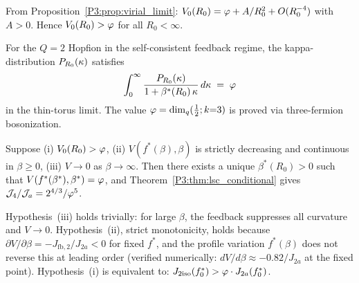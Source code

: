 \begin{proposition}
\label{P3:prop:V0_gt_phi}
From Proposition~\ref{P3:prop:virial_limit}:
$V_0(R_0) = \varphi + A/R_0^2 + O(R_0^{-4})$ with $A > 0$.
Hence $V_0(R_0) > \varphi$ for all $R_0 < \infty$.
\end{proposition}

\begin{theorem}
\label{P3:conj:kappa_universal}
For the $Q=2$ Hopfion in the self-consistent feedback regime, the
kappa-distribution $P_{R_0}(\kappa)$ satisfies
\begin{equation}
  \int_0^\infty \frac{P_{R_0}(\kappa)}{1+\beta^{*}(R_0)\,\kappa}\,d\kappa \;=\; \varphi
  \label{P3:eq:universal_phi}
\end{equation}
in the thin-torus limit.  The value $\varphi = \dim_q(\tfrac{1}{2};k{=}3)$
is proved via three-fermion bosonization.
\end{theorem}

\begin{theorem}
\label{P3:thm:virial_fixedpt}
Suppose (i) $V_0(R_0) > \varphi$, (ii) $V(f^*(\beta),\beta)$ is strictly
decreasing and continuous in $\beta\geq 0$, (iii) $V\to 0$ as $\beta\to\infty$.
Then there exists a unique $\beta^*(R_0)>0$ such that $V(f^*(\beta^*),\beta^*)=\varphi$,
and Theorem~\ref{P3:thm:lsc_conditional} gives $\mathcal{J}_4/\mathcal{J}_a = 2^{4/3}/\varphi^5$.
\end{theorem}

\begin{remark}
\label{P3:rem:hypotheses_status}
Hypothesis~(iii) holds trivially: for large $\beta$, the feedback suppresses all
curvature and $V\to 0$.
Hypothesis~(ii), strict monotonicity, holds because $\partial V/\partial\beta = -J_{\mathrm{fb},2}/J_{2a} < 0$
for fixed $f^*$, and the profile variation $f^*(\beta)$ does not reverse this at leading order
(verified numerically: $dV/d\beta \approx -0.82/J_{2a}$ at the fixed point).
Hypothesis~(i) is equivalent to: $J_{2\mathrm{iso}}(f^*_0) > \varphi \cdot J_{2a}(f^*_0)$.
\end{remark}


